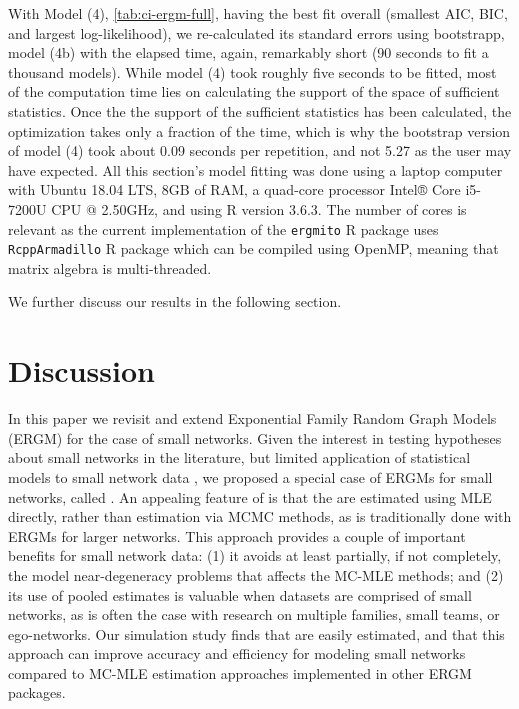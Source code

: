 \documentclass[review, nonatbib,doubleblind]{elsarticle/elsarticle}
\begin{document}
With Model (4), \autoref{tab:ci-ergm-full}, having the best fit overall (smallest AIC, BIC, and largest log-likelihood), we re-calculated its standard errors using bootstrapp, model (4b) with the elapsed time, again, remarkably short (90 seconds to fit a thousand models). While model (4) took roughly five seconds to be fitted, most of the computation time lies on calculating the support of the space of sufficient statistics. Once the the support of the sufficient statistics has been calculated, the optimization takes only a fraction of the time, which is why the bootstrap version of model (4) took about 0.09 seconds per repetition, and not 5.27 as the user may have expected. All this section's model fitting was done using a laptop computer with Ubuntu 18.04 LTS, 8GB of RAM, a quad-core processor Intel® Core i5-7200U CPU @ 2.50GHz, and using R version 3.6.3. The number of cores is relevant as the current implementation of the \texttt{ergmito} R package uses \texttt{RcppArmadillo} R package \cite{Eddelbuettel2014} which can be compiled using OpenMP, meaning that matrix algebra is multi-threaded.

We further discuss our results in the following section.


\section{Discussion}

In this paper we revisit and extend Exponential Family Random Graph Models (ERGM) for the case of small networks. Given the interest in testing hypotheses about small networks in the literature, but limited application of statistical models to small network data \cite[][and others]{Robins2007,Holland1981,Frank1986,Wasserman1996,Snijders2006}, we proposed a special case of ERGMs for small networks, called \ergmitos{}. An appealing feature of \ergmitos{} is that the are estimated using MLE directly, rather than estimation via MCMC methods, as is traditionally done with ERGMs for larger networks. This approach provides a couple of important benefits for small network data: (1) it avoids at least partially, if not completely, the model near-degeneracy problems that affects the MC-MLE methods; and (2) its use of pooled estimates is valuable when datasets are comprised of small networks, as is often the case with research on multiple families, small teams, or ego-networks. Our simulation study finds that \ergmitos{} are easily estimated, and that this approach can improve accuracy and efficiency for modeling small networks compared to MC-MLE estimation approaches implemented in other ERGM packages.
\end{document}
